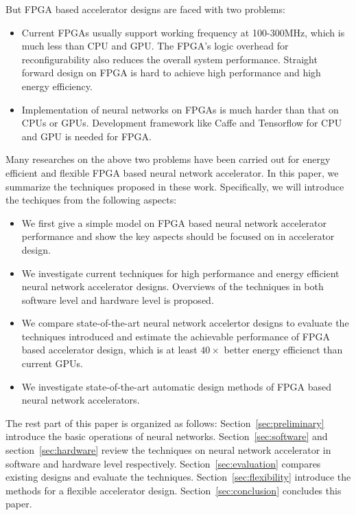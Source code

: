 But FPGA based accelerator designs are faced with two problems:
\begin{itemize}
    \item Current FPGAs usually support working frequency at 100-300MHz, which is much less than CPU and GPU. The FPGA's logic overhead for reconfigurability also reduces the overall system performance. Straight forward design on FPGA is hard to achieve high performance and high energy efficiency.
    \item Implementation of neural networks on FPGAs is much harder than that on CPUs or GPUs. Development framework like Caffe and Tensorflow for CPU and GPU is needed for FPGA.
\end{itemize}
 
Many researches on the above two problems have been carried out for energy efficient and flexible FPGA based neural network accelerator. In this paper, we summarize the techniques proposed in these work. Specifically, we will introduce the techiques from the following aspects:
\begin{itemize}
    \item We first give a simple model on FPGA based neural network accelerator performance and show the key aspects should be focused on in accelerator design.
    \item We investigate current techniques for high performance and energy efficient neural network accelerator designs. Overviews of the techniques in both software level and hardware level is proposed.
    \item We compare state-of-the-art neural network accelertor designs to evaluate the techniques introduced and estimate the achievable performance of FPGA based accelerator design, which is at least $40\times$ better energy efficienct than current GPUs.
    \item We investigate state-of-the-art automatic design methods of FPGA based neural network accelerators. 
\end{itemize}

The rest part of this paper is organized as follows: Section~\ref{sec:preliminary} introduce the basic operations of neural networks. Section~\ref{sec:software} and section~\ref{sec:hardware} review the techniques on neural network accelerator in software and hardware level respectively. Section~\ref{sec:evaluation} compares existing designs and evaluate the techniques. Section~\ref{sec:flexibility} introduce the methods for a flexible accelerator design. Section~\ref{sec:conclusion} concludes this paper.